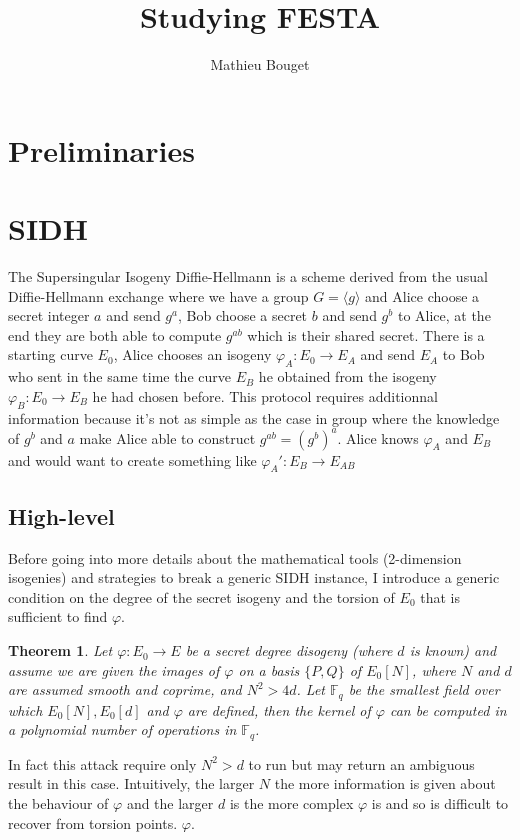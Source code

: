 \documentclass[11pt]{article}
\author{Mathieu Bouget}
\title{Studying FESTA}
\newtheorem{theorem}{Theorem}
\begin{document}
		\maketitle

		\section{Preliminaries}
		\section{SIDH}
			The Supersingular Isogeny Diffie-Hellmann is a scheme derived from the usual
			Diffie-Hellmann exchange where we have a group $G= \langle g\rangle$ and Alice choose a
			secret integer $a$ and send $g^a$, Bob choose a secret $b$ and send $g^b$ to Alice,
			at the end they are both able to compute $g^{ab}$ which is their shared secret.
			There is a starting curve $E_0$, Alice chooses an isogeny $\varphi_A:E_0\to E_A$
			and send $E_A$ to Bob who sent in the same time the curve $E_B$ he obtained
			from the isogeny $\varphi_B:E_0\to E_B$ he had chosen before.
			This protocol requires additionnal information because it's not as simple as the
			case in group where the knowledge of $g^b$ and $a$ make Alice able to construct
			$g^{ab}=(g^b)^a$.
			Alice knows $\varphi_A$ and  $E_B$ and would want to create something like
			$\varphi_A':E_B\to E_{AB}$

			\subsection{High-level}
			Before going into more details about the mathematical tools (2-dimension isogenies)
			and strategies to break a generic SIDH instance, I introduce a generic condition
			on the degree of the secret isogeny and the torsion of $E_0$ that is sufficient
			to find $\varphi$.
			\begin{theorem}{\cite{sidhpolyattack}}
				Let $\varphi:E_0 \to E$ be a secret degree disogeny (where $d$
				is known) and assume we are given the images of $\varphi$ on a basis $\{P,Q\}$ of $E_0[N]$,
				where $N$ and $d$ are assumed smooth and coprime, and $N^2 > 4d$. Let $\mathbb{F}_q$ be the
				smallest field over which $E_0[N],E_0[d]$ and $\varphi$ are defined, then the kernel of
				$\varphi$ can be computed in a polynomial number of operations in $\mathbb{F}_q$.
			\end{theorem}
			In fact this attack require only $N^2>d$ to run but may return an ambiguous result
			in this case. Intuitively, the larger $N$ the more information is given about
			the behaviour of $\varphi$ and the larger $d$ is the more complex $\varphi$ is and
			so is difficult to recover from torsion points.
			$\varphi$.
\end{document}
